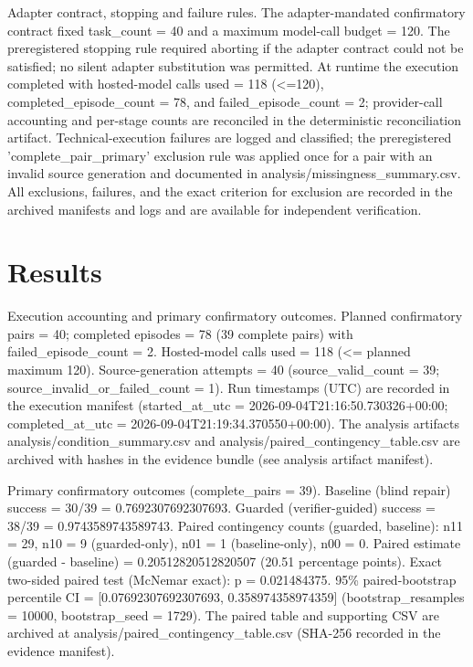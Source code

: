 \documentclass[conference]{IEEEtran}
\begin{document}
Adapter contract, stopping and failure rules. The adapter-mandated confirmatory contract fixed task\_count = 40 and a maximum model-call budget = 120. The preregistered stopping rule required aborting if the adapter contract could not be satisfied; no silent adapter substitution was permitted. At runtime the execution completed with hosted-model calls used = 118 (<=120), completed\_episode\_count = 78, and failed\_episode\_count = 2; provider-call accounting and per-stage counts are reconciled in the deterministic reconciliation artifact. Technical-execution failures are logged and classified; the preregistered 'complete\_pair\_primary' exclusion rule was applied once for a pair with an invalid source generation and documented in analysis/missingness\_summary.csv. All exclusions, failures, and the exact criterion for exclusion are recorded in the archived manifests and logs and are available for independent verification.

\section{Results}
Execution accounting and primary confirmatory outcomes. Planned confirmatory pairs = 40; completed episodes = 78 (39 complete pairs) with failed\_episode\_count = 2. Hosted-model calls used = 118 (<= planned maximum 120). Source-generation attempts = 40 (source\_valid\_count = 39; source\_invalid\_or\_failed\_count = 1). Run timestamps (UTC) are recorded in the execution manifest (started\_at\_utc = 2026-09-04T21:16:50.730326+00:00; completed\_at\_utc = 2026-09-04T21:19:34.370550+00:00). The analysis artifacts analysis/condition\_summary.csv and analysis/paired\_contingency\_table.csv are archived with hashes in the evidence bundle (see analysis artifact manifest).

Primary confirmatory outcomes (complete\_pairs = 39). Baseline (blind repair) success = 30/39 = 0.7692307692307693. Guarded (verifier-guided) success = 38/39 = 0.9743589743589743. Paired contingency counts (guarded, baseline): n11 = 29, n10 = 9 (guarded-only), n01 = 1 (baseline-only), n00 = 0. Paired estimate (guarded - baseline) = 0.20512820512820507 (20.51 percentage points). Exact two-sided paired test (McNemar exact): p = 0.021484375. 95\% paired-bootstrap percentile CI = [0.07692307692307693, 0.358974358974359] (bootstrap\_resamples = 10000, bootstrap\_seed = 1729). The paired table and supporting CSV are archived at analysis/paired\_contingency\_table.csv (SHA-256 recorded in the evidence manifest).
\end{document}
